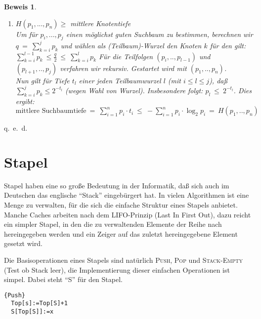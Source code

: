 \documentclass[ngerman,draft,parskip=half*,twoside]{scrreprt}
\theoremstyle{break}
\newtheorem{beweis}{Beweis}
\begin{document}
\begin{beweis}
\begin{enumerate}
    \item $\displaystyle H(p_1,...,p_n)\geq$ mittlere Knotentiefe  \vspace{2mm}\\
      Um für $p_i,...,p_j$ einen möglichst guten Suchbaum zu bestimmen, berechnen wir\\ $q\:=\:\sum_{k=i}^j p_k$ und wählen
      als (Teilbaum)-Wurzel den Knoten $k$ für den gilt: $\sum_{k=i}^{l-1}p_k\:\leq\frac{q}{2}\:\leq\:\sum_{k=i}^{l}p_k$
      Für die Teilfolgen $(p_i,..,p_{l-1})$ und $(p_{l+1},..,p_j)$ verfahren wir rekursiv. Gestartet wird mit $(p_1,..,p_n)$.\\
      Nun gilt für Tiefe $t_l$ einer jeden Teilbaumwurzel $l$ (mit $i\leq l\leq j$), daß $\sum_{k=i}^j p_k \leq 2^{-t_l}$
      (wegen Wahl von Wurzel). Insbesondere folgt: $p_l\:\leq\:2^{-t_l}$. Dies ergibt:
      $\mbox{mittlere Suchbaumtiefe}\:=\:\sum_{i=1}^n p_i\cdot t_i\:\leq\:-\sum_{i=1}^n p_i\cdot \log_2p_i\:=\:H(p_1,..,p_n)$
\end{enumerate}
\end{beweis}
\begin{flushright} q.~e.~d. \end{flushright}

\section{Stapel}
Stapel haben eine so große Bedeutung in der Informatik, daß sich auch im Deutschen das englische "`Stack"' eingebürgert hat.
In vielen Algorithmen ist eine Menge zu verwalten, für die sich die einfache Struktur eines Stapels anbietet.
Manche Caches arbeiten nach dem LIFO-Prinzip (Last In First Out), dazu reicht ein simpler Stapel, in den die zu verwaltenden Elemente
der Reihe nach hereingegeben werden und ein Zeiger auf das zuletzt hereingegebene Element gesetzt wird.

\begin{figure}[H]
  \centering
  \label{031203a}
\end{figure}

Die Basisoperationen eines Stapels sind natürlich \textsc{Push}, \textsc{Pop} und \textsc{Stack-Empty} (Test ob Stack leer), die Implementierung dieser einfachen
Operationen ist simpel. Dabei steht "`S"' für den Stapel.

\begin{Algorithmus}[H]
\begin{lstlisting}[frame=tlrb, mathescape=true, title=\textsc{Push}, gobble=1]{Push}
  Top[s]:=Top[S]+1
  S[Top[S]]:=x
\end{lstlisting}
\end{Algorithmus}
\end{document}
